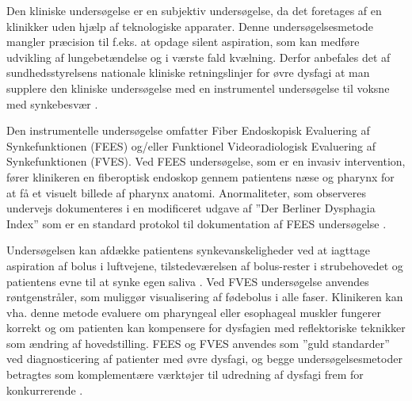 \documentclass[main.tex]{subfiles}
\begin{document}
Den kliniske undersøgelse er en subjektiv undersøgelse, da det foretages af en klinikker uden hjælp af teknologiske apparater. Denne undersøgelsesmetode mangler præcision til f.eks. at opdage silent aspiration, som kan medføre udvikling af lungebetændelse og i værste fald kvælning. Derfor anbefales det af sundhedsstyrelsens nationale kliniske retningslinjer for øvre dysfagi at man supplere den kliniske undersøgelse med en instrumentel undersøgelse til voksne med synkebesvær \cite{Sundhedsstyrelsen2015NationalDysfagi}.

Den instrumentelle undersøgelse omfatter Fiber Endoskopisk Evaluering af Synkefunktionen (FEES) og/eller Funktionel Videoradiologisk Evaluering af Synkefunktionen (FVES).  Ved FEES undersøgelse, som er en invasiv intervention, fører klinikeren en fiberoptisk endoskop gennem patientens næse og pharynx for at få et visuelt billede af pharynx anatomi. Anormaliteter, som observeres undervejs dokumenteres i en modificeret udgave af ”Der Berliner Dysphagia Index” som er en standard protokol til dokumentation af FEES undersøgelse \cite{afLambertsenKMDKock-JensenCMDKjrsgaardAMScOTHansenTSMsci/MPHWestergaardLMD2007ModificeretIndex}. 

Undersøgelsen kan afdække patientens synkevanskeligheder ved at iagttage aspiration af bolus i luftvejene, tilstedeværelsen af bolus-rester i strubehovedet og patientens evne til at synke egen saliva \cite[s. 27-28]{Kjaersgaard2013DifficultiesPerspective}. 
Ved FVES undersøgelse anvendes røntgenstråler, som muliggør visualisering af fødebolus i alle faser. Klinikeren kan vha. denne metode evaluere om pharyngeal eller esophageal muskler fungerer korrekt og om patienten kan kompensere for dysfagien med reflektoriske teknikker som ændring af hovedstilling. FEES og FVES anvendes som ”guld standarder” ved diagnosticering af patienter med øvre dysfagi, og begge undersøgelsesmetoder betragtes som komplementære værktøjer til udredning af dysfagi frem for konkurrerende \cite[s. 50]{Kjaersgaard2013DifficultiesPerspective}.




\end{document}
